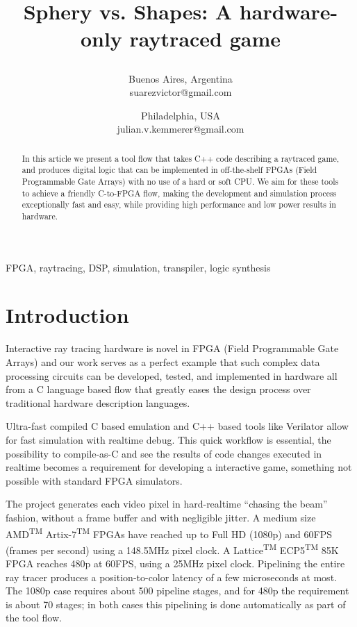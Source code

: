 \documentclass[conference]{IEEEtran}
\begin{document}
\title{Sphery vs. Shapes: A hardware-only raytraced game\\

\author{
Buenos Aires, Argentina \\
suarezvictor@gmail.com
\and
{}
Philadelphia, USA \\
julian.v.kemmerer@gmail.com
}}

\maketitle

\begin{abstract}
In this article we present a tool flow that takes C++ code describing a raytraced game, and produces digital logic that can be implemented in off-the-shelf FPGAs (Field Programmable Gate Arrays) with no use of a hard or soft CPU. We aim for these tools to achieve a friendly C-to-FPGA flow, making the development and simulation process exceptionally fast and easy, while providing high performance and low power results in hardware.
\end{abstract}

\begin{IEEEkeywords}
FPGA, raytracing, DSP, simulation, transpiler, logic synthesis
\end{IEEEkeywords}

\section{Introduction}
Interactive ray tracing hardware is novel in FPGA (Field Programmable Gate Arrays) and our work serves as a perfect example that such complex data processing circuits can be developed, tested, and implemented in hardware all from a C language based flow that greatly eases the design process over traditional hardware description languages.

Ultra-fast compiled C based emulation and C++ based tools like Verilator\cite{verilator} allow for fast simulation with realtime debug. This quick workflow is essential, the possibility to compile-as-C and see the results of code changes executed in realtime becomes a requirement for developing a interactive game, something not possible with standard FPGA simulators.

The project generates each video pixel in hard-realtime “chasing the beam” fashion, without a frame buffer and with negligible jitter. A medium size AMD\textsuperscript{TM}  Artix-7\textsuperscript{TM} FPGAs have reached up to Full HD (1080p) and 60FPS (frames per second) using a 148.5MHz pixel clock. A Lattice\textsuperscript{TM}  ECP5\textsuperscript{TM} 85K FPGA reaches 480p at 60FPS, using a 25MHz pixel clock. Pipelining the entire ray tracer produces a position-to-color latency of a few microseconds at most. The 1080p case requires about 500 pipeline stages, and for 480p the requirement is about 70 stages; in both cases this pipelining is done automatically as part of the tool flow.
\end{document}
